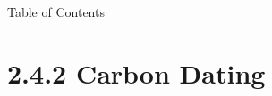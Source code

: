 

 \begin{frame}{Table of Contents }
\mapofcontentsB{\bd}
\label{note2.4.2a}
 \end{frame}

\section{2.4.2 Carbon Dating}

